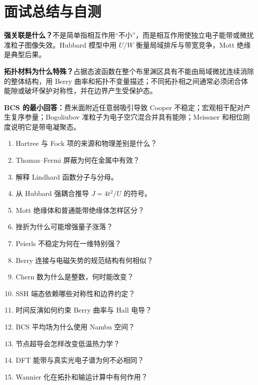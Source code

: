 \section{面试总结与自测}
\begin{interviewbox}
\textbf{强关联是什么？}不是简单指相互作用“不小”，而是相互作用使独立电子能带或微扰准粒子图像失效。Hubbard 模型中用 $U/W$ 衡量局域排斥与带宽竞争，Mott 绝缘是典型后果。

\textbf{拓扑材料为什么特殊？}占据态波函数在整个布里渊区具有不能由局域微扰连续消除的整体结构，用 Berry 曲率和拓扑不变量描述；不同拓扑相之间通常必须闭合体能隙或破坏保护对称性，并在边界产生受保护态。

\textbf{BCS 的最小回答：}费米面附近任意弱吸引导致 Cooper 不稳定；宏观相干配对产生复序参量；Bogoliubov 准粒子为电子空穴混合并具有能隙；Meissner 和相位刚度说明它是带电凝聚态。
\end{interviewbox}
\begin{selftestbox}
\begin{enumerate}
\item Hartree 与 Fock 项的来源和物理差别是什么？
\item Thomas--Fermi 屏蔽为何在金属中有效？
\item 解释 Lindhard 函数分子与分母。
\item 从 Hubbard 强耦合推导 $J=4t^2/U$ 的符号。
\item Mott 绝缘体和普通能带绝缘体怎样区分？
\item 挫折为什么可能增强量子涨落？
\item Peierls 不稳定为何在一维特别强？
\item Berry 连接与电磁矢势的规范结构有何相似？
\item Chern 数为什么是整数，何时能改变？
\item SSH 端态依赖哪些对称性和边界约定？
\item 时间反演如何约束 Berry 曲率与 Hall 电导？
\item BCS 平均场为什么使用 Nambu 空间？
\item 节点超导会怎样改变低温热力学？
\item DFT 能带与真实光电子谱为何不必相同？
\item Wannier 化在拓扑和输运计算中有何作用？
\end{enumerate}
\end{selftestbox}
